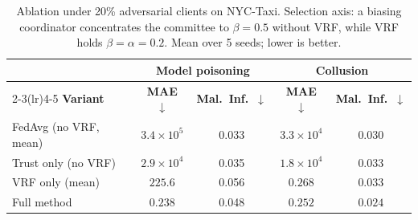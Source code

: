 \begin{table}[t]
\centering
\caption{Ablation under 20\% adversarial clients on NYC-Taxi. Selection axis: a
biasing coordinator concentrates the committee to $\beta=0.5$ without VRF, while
VRF holds $\beta=\alpha=0.2$. Mean over 5 seeds; lower is better.}
\label{tab:ablation}
\scriptsize
\setlength{\tabcolsep}{4pt}
\begin{tabular}{lcccc}
\toprule
& \multicolumn{2}{c}{\textbf{Model poisoning}} & \multicolumn{2}{c}{\textbf{Collusion}} \\
\cmidrule(lr){2-3}\cmidrule(lr){4-5}
\textbf{Variant} & \textbf{MAE $\downarrow$} & \textbf{Mal.\ Inf.\ $\downarrow$}
                 & \textbf{MAE $\downarrow$} & \textbf{Mal.\ Inf.\ $\downarrow$} \\
\midrule
FedAvg (no VRF, mean)    & $3.4{\times}10^{5}$ & 0.033 & $3.3{\times}10^{4}$ & 0.030 \\
Trust only (no VRF)      & $2.9{\times}10^{4}$ & 0.035 & $1.8{\times}10^{4}$ & 0.033 \\
VRF only (mean)          & $225.6$             & 0.056 & $0.268$             & 0.033 \\
Full method              & $\mathbf{0.238}$    & 0.048 & $\mathbf{0.252}$    & $\mathbf{0.024}$ \\
\bottomrule
\end{tabular}
\end{table}
